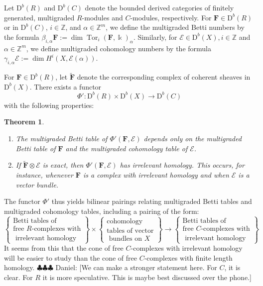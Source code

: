 \documentclass[12pt]{amsart}
\newtheorem{theorem}[lemma]{Theorem}
\theoremstyle{definition}
\theoremstyle{remark}
\newcommand{\Tor}{\operatorname{Tor}}
\newcommand{\kk}{\Bbbk}
\newcommand{\ZZ}{\mathbb{Z}}
\newcommand{\cE}{\mathcal{E}}
\newcommand{\FF}{\mathbf{F}}
\newcommand{\DD}{\mathrm{D}}
\newcommand{\daniel}[1]{{\color{green} \sf $\clubsuit\clubsuit\clubsuit$ Daniel: [#1]}}
\begin{document}
Let $\DD^b(R)$ and $\DD^b(C)$ denote the bounded derived categories of finitely generated, multigraded $R$-modules and $C$-modules, respectively.   For $\FF\in \DD^b(R)$ or in $\DD^b(C)$, $i\in \ZZ$, and $\alpha\in \ZZ^m$, we define the multigraded Betti numbers by the formula $\beta_{i,\alpha} \FF:=\dim \Tor_i(\FF,\kk)_{\alpha}$.  Similarly, for $\cE\in \DD^b(X), i\in \ZZ$ and $\alpha\in \ZZ^m$, we define multigraded cohomology numbers by the formula $\gamma_{i,\alpha} \cE:=\dim H^i(X, \cE(\alpha))$.  


For  $\FF\in \DD^b(R)$, let $\widetilde{\FF}$ denote the corresponding complex of coherent sheaves in $\DD^b(X)$.  There exists a functor
\[
\Phi': \DD^b(R)\times \DD^b(X)\to \DD^b(C)
\]
with the following properties:
\begin{theorem}\label{thm:Phimulti}
\begin{enumerate}
	\item\label{thm:Phi':1}  The multigraded Betti table of $\Phi'(\FF,\cE)$ depends only on the multigraded Betti table of $\FF$ and the multigraded cohomology table of $\cE$.
	\item\label{thm:Phi':2}  If $\widetilde{\FF}\otimes \cE$ is exact, then $\Phi'(\FF,\cE)$ has irrelevant homology.  This occurs, for instance, whenever $\FF$ is a complex with irrelevant homology and when $\cE$ is a vector bundle.
\end{enumerate}
\end{theorem}



The functor $\Phi'$ thus yields bilinear pairings relating multigraded Betti tables and multigraded cohomology tables, including a pairing of the form:
\begin{equation*}%
\label{eqn:multipairing}
%
\left\{\begin{matrix}
\text{Betti tables of} \\ \text{free $R$-complexes with}\\
\text{  irrelevant homology}\end{matrix}\right\}
%
\times 
%
\left\{\begin{matrix}
\text{cohomology }\\
\text{tables of vector}\\
\text{ bundles on } X
\end{matrix}\right\}
%
\longrightarrow
\left\{\begin{matrix}
\text{Betti tables of} \\ \text{free $C$-complexes with}\\
\text{  irrelevant homology}
\end{matrix}\right\}
\end{equation*}
It seems from this that the cone of free $C$-complexes with irrelevant homology will be easier to study than the cone of free $C$-complexes with finite length homology.  \daniel{We can make a stronger statement here.  For $C$, it is clear.  For $R$ it is more speculative.  This is maybe best discussed over the phone.}
\end{document}
